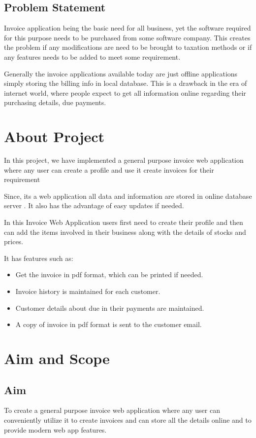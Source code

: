 \subsection{Problem Statement}
Invoice application being the basic need for all business, yet the software required for this purpose needs to be purchased from some software company. This creates the problem if any modifications are need to be brought to taxation methods or if any features needs to be added to meet some requirement.

Generally the invoice applications available today are just offline applications simply storing the billing info in local database. This is a drawback in the era of internet world, where people expect to get all information online regarding their purchasing details, due payments.


\section{About Project}
In this project, we have implemented a general purpose invoice web application where any user can create a profile and use it create invoices for their requirement

Since, its a web application all data and information are stored in online database server . It also has the advantage of easy updates if needed.

In this Invoice Web Application users first need to create their profile and then can add the items involved in their business along with the details of stocks and prices. 

It has features such as:
\begin{itemize}
\item Get the invoice in pdf format, which can be printed if needed.
\item Invoice history is maintained for each customer.
\item Customer details about due in their payments are maintained.
\item A copy of invoice in pdf format is sent to the customer email.\\[0.5cm]
\end{itemize}

\section{Aim and Scope}
\subsection{Aim}
To create a general purpose invoice web application where any user can conveniently utilize it to create invoices and can store all the details online and to provide modern web app features.
